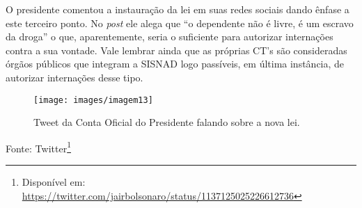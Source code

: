 \documentclass[
	12pt,				%
	oneside,			%
	a4paper,			%
	sumario=tradicional,
	english,			%
	brazil				%
	]{abntex2}
\newcommand{\bcenter}{\begin{center}}
\newcommand{\ecenter}{\end{center}}
\begin{document}
O presidente comentou a instauração da lei em suas redes sociais dando ênfase a este terceiro ponto. No \emph{post} ele alega que ``o dependente não é livre, é um escravo da droga'' o que, aparentemente, seria o suficiente para autorizar internações contra a sua vontade. Vale lembrar ainda que as próprias CT's são consideradas órgãos públicos que integram a SISNAD logo passíveis, em última instância, de autorizar internações desse tipo.
\begin{figure}[H]

{\centering \texttt{[image: images/imagem13]} 

}

\caption{Tweet da Conta Oficial do Presidente falando sobre a nova lei.}\label{fig:imagem13}
\end{figure}
\bcenter

Fonte: Twitter\footnote{Disponível em: \url{https://twitter.com/jairbolsonaro/status/1137125025226612736}}
\ecenter
\end{document}
